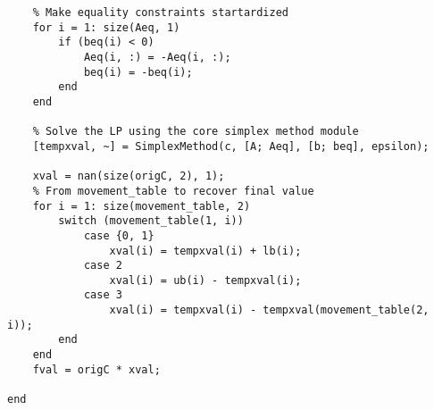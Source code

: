 \documentclass[bwprint, withouttitlepage]{mathexpthesis}
\begin{document}
\begin{appendices}
\begin{verbatim}
    % Make equality constraints startardized
    for i = 1: size(Aeq, 1)
        if (beq(i) < 0)
            Aeq(i, :) = -Aeq(i, :);
            beq(i) = -beq(i);
        end
    end
    
    % Solve the LP using the core simplex method module
    [tempxval, ~] = SimplexMethod(c, [A; Aeq], [b; beq], epsilon);

    xval = nan(size(origC, 2), 1);
    % From movement_table to recover final value
    for i = 1: size(movement_table, 2)
        switch (movement_table(1, i))
            case {0, 1}
                xval(i) = tempxval(i) + lb(i);
            case 2
                xval(i) = ub(i) - tempxval(i);
            case 3
                xval(i) = tempxval(i) - tempxval(movement_table(2, i));
        end
    end
    fval = origC * xval;
    
end
    
\end{verbatim}
\end{appendices}
\end{document}
